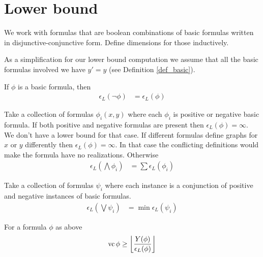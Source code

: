 \documentclass{amsart}
\providecommand{\floor}[1]{\left \lfloor #1 \right \rfloor }
\begin{document}
\section{Lower bound}

We work with formulas that are boolean combinations of basic formulas written in disjunctive-conjunctive form.
Define dimensions for those inductively.

As a simplification for our lower bound computation we assume that all the basic formulas involved we have $y' = y$ (see Definition \ref{def_basic}).

\begin{Definition}[Negation]
	If $\phi$ is a basic formula, then
	\begin{align*}
		\epsilon_L(\neg \phi) &= \epsilon_L(\phi)
	\end{align*}
\end{Definition}

\begin{Definition}[Conjunction]
	Take a collection of formulas $\phi_i(x, y)$ where each $\phi_i$ is positive or negative basic formula.
	If both positive and negative formulas are present then $\epsilon_L(\phi) = \infty$.
	We don't have a lower bound for that case.
	If different formulas define graphs for $x$ or $y$ differently then $\epsilon_L(\phi) = \infty$.
	In that case the conflicting definitions would make the formula have no realizations.
	Otherwise
	\begin{align*}
		\epsilon_L(\bigwedge \phi_i) &= \sum \epsilon_L(\phi_i)
	\end{align*}
\end{Definition}

\begin{Definition} [Disjunction]
	Take a collection of formulas $\psi_i$ where each instance is a conjunction of positive and negative instances of basic formulas.
	\begin{align*}
		\epsilon_L(\bigvee \psi_i) &= \min \epsilon_L(\psi_i)
	\end{align*}
\end{Definition}

\begin{Theorem}
	For a formula $\phi$ as above
	\begin{align*}
		\vc \phi \geq \floor{\frac{Y(\phi)}{\epsilon_L(\phi)}}
	\end{align*}
\end{Theorem}
\end{document}
